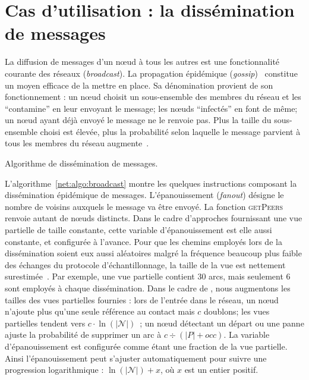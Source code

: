 
\section{Cas d'utilisation : la dissémination de messages}
\label{net:sec:usecase}

La diffusion de messages d'un nœud à tous les autres est une fonctionnalité
courante des réseaux (\emph{broadcast}). La propagation épidémique
(\emph{gossip})~\cite{birman1999bimodal} constitue un moyen efficace de la
mettre en place. Sa dénomination provient de son fonctionnement : un nœud
choisit un sous-ensemble des membres du réseau et les ``contamine'' en leur
envoyant le message; les nœuds ``infectés'' en font de même; un nœud ayant déjà
envoyé le message ne le renvoie pas. Plus la taille du sous-ensemble choisi est
élevée, plus la probabilité selon laquelle le message parvient à tous les
membres du réseau augmente~\cite{erdos1959random}.

\begin{algorithm}
  
  \caption[Algorithme de dissémination de
  messages]{\label{net:algo:broadcast}Algorithme de dissémination de messages.}
\end{algorithm}


L'algorithme~\ref{net:algo:broadcast} montre les quelques instructions composant
la dissémination épidémique de messages. L'épanouissement (\emph{fanout})
désigne le nombre de voisins auxquels le message va être envoyé. La fonction
\textsc{getPeers} renvoie autant de nœuds distincts. Dans le cadre d'approches
fournissant une vue partielle de taille constante, cette variable
d'épanouissement est elle aussi constante, et configurée à l'avance. Pour que
les chemins employés lors de la dissémination soient eux aussi aléatoires malgré
la fréquence beaucoup plus faible des échanges du protocole d'échantillonnage,
la taille de la vue est nettement surestimée~\cite{frey2009heterogeneous}. Par
exemple, une vue partielle contient 30 arcs, mais seulement 6 sont employés à
chaque dissémination. Dans le cadre de \SPRAY, nous augmentons les tailles des
vues partielles fournies : lors de l'entrée dans le réseau, un nœud n'ajoute
plus qu'une seule référence au contact mais $c$ doublons; les vues partielles
tendent vers $c\cdot\ln(|\mathcal{N}|)$~\cite{ganesh2003peer}; un nœud détectant
un départ ou une panne ajuste la probabilité de supprimer un arc à
$c \div (|P|+occ)$. La variable d'épanouissement est configurée comme étant une
fraction de la vue partielle. Ainsi l'épanouissement peut s'ajuster
automatiquement pour suivre une progression logarithmique :
$\ln(|\mathcal{N}|)+x$, où $x$ est un entier positif.

